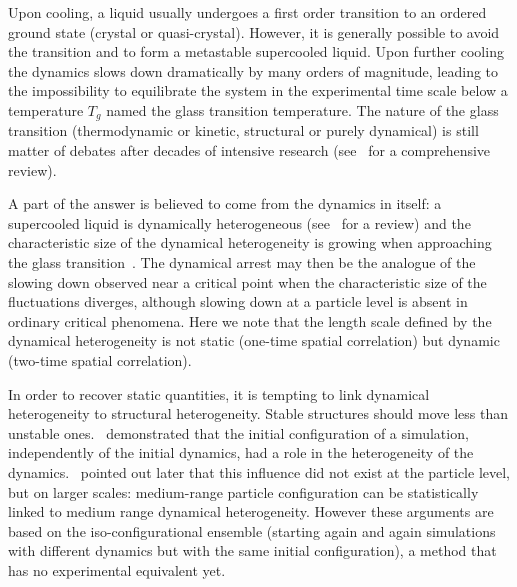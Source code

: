 
Upon cooling, a liquid usually undergoes a first order transition to an ordered ground state (crystal or quasi-crystal). However, it is generally possible to avoid the transition and to form a metastable supercooled liquid. Upon further cooling the dynamics slows down dramatically by many orders of magnitude, leading to the impossibility to equilibrate the system in the experimental time scale below a temperature $T_g$ named the glass transition temperature. The nature of the glass transition (thermodynamic or kinetic, structural or purely dynamical) is still matter of debates after decades of intensive research (see~\citep{cavagna2009supercooled} for a comprehensive review).

A part of the answer is believed to come from the dynamics in itself: a supercooled liquid is dynamically heterogeneous (see~\citep{Berthier2011} for a review) and the characteristic size of the dynamical heterogeneity is growing when approaching the glass transition~\citep{Donati1999, Berthier2005}. The dynamical arrest may then be the analogue of the slowing down observed near a critical point when the characteristic size of the fluctuations diverges, although slowing down at a particle level is absent in ordinary critical phenomena. Here we note that the length scale defined by the dynamical heterogeneity is not static (one-time spatial correlation) but dynamic (two-time spatial correlation). 

In order to recover static quantities, it is tempting to link dynamical heterogeneity to structural heterogeneity. Stable structures should move less than unstable ones.~\citet{Widmer-Cooper2005} demonstrated that the initial configuration of a simulation, independently of the initial dynamics, had a role in the heterogeneity of the dynamics.~\citet{Berthier2007} pointed out later that this influence did not exist at the particle level, but on larger scales: medium-range particle configuration can be statistically linked to medium range dynamical heterogeneity. However these arguments are based on the iso-configurational ensemble (starting again and again simulations with different dynamics but with the same initial configuration), a method that has no experimental equivalent yet.

